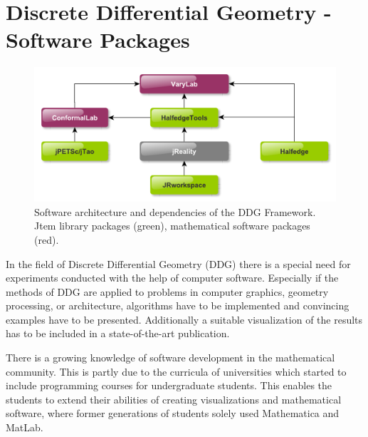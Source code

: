 \chapter{Discrete Differential Geometry - Software Packages}

\begin{figure}[h]
	\includegraphics[width=\linewidth]{figures/software_architecture}
	\caption[Software package dependencies]{
		Software architecture and dependencies of the DDG Framework. 
		{\sc Jtem} library packages (green), mathematical software packages (red).
	}
	\label{fig:software_architecture}
\end{figure}

In the field of Discrete Differential Geometry (DDG) there is a special need for experiments
conducted with the help of computer software. Especially if the methods of DDG are applied
to problems in computer graphics, geometry processing, or architecture, algorithms have 
to be implemented and convincing examples have to be presented. Additionally a suitable 
visualization of the results has to be included in a state-of-the-art publication.

There is a growing knowledge of software development in the mathematical community. This 
is partly due to the curricula of universities which started to include programming courses for 
undergraduate students. This enables the students to extend their abilities of creating 
visualizations and mathematical software, where former generations of students solely 
used Mathematica and MatLab.

